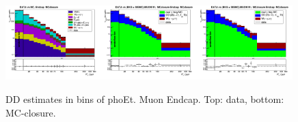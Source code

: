 \begin{figure}[htb]
\begin{center}
   \includegraphics[width=0.33\textwidth]{../figs/figs_v11/MUON_WGamma/PrepareYields/c_TotalDATAvsMC_Endcap__phoEt_MCclosure.png}\includegraphics[width=0.33\textwidth]{../figs/figs_v11/MUON_WGamma/PrepareYields/c_DATAvsBkgPlusSigMCc_MUON_WGamma_TEMPL_CHISO_UNblind_MCclosure__Endcap__phoEt_MCclosure.png}\includegraphics[width=0.33\textwidth]{../figs/figs_v11/MUON_WGamma/PrepareYields/c_DATAvsBkgPlusSigMCc_MUON_WGamma_TEMPL_SIHIH_UNblind_MCclosure__Endcap__phoEt_MCclosure.png}
  \caption{DD estimates in bins of phoEt. Muon Endcap. Top: data, bottom: MC-closure.}
  \end{center}
\end{figure}

